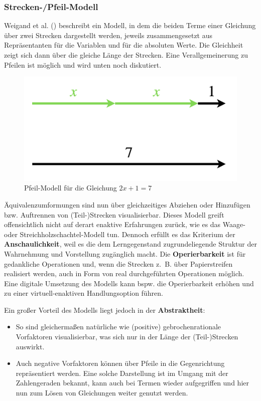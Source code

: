 \documentclass[
]{scrbook}
\theoremstyle{definition}
\theoremstyle{definition}
\theoremstyle{definition}
\theoremstyle{definition}
\theoremstyle{remark}
\begin{document}
\subsubsection{Strecken-/Pfeil-Modell}\label{strecken-pfeil-modell}

Weigand et al. () beschreibt ein Modell, in dem die beiden Terme einer Gleichung über zwei Strecken dargestellt werden, jeweils zusammengesetzt aus Repräsentanten für die Variablen und für die absoluten Werte. Die Gleichheit zeigt sich dann über die gleiche Länge der Strecken. Eine Verallgemeinerung zu Pfeilen ist möglich und wird unten noch diskutiert.

\begin{figure}

{\centering \includegraphics[width=0.5\linewidth]{pictures/8-Pfeile} 

}

\caption{Pfeil-Modell für die Gleichung $2x+1 = 7$}\label{fig:Pfeile}
\end{figure}

Äquivalenzumformungen sind nun über gleichzeitiges Abziehen oder Hinzufügen bzw. Auftrennen von (Teil-)Strecken visualisierbar. Dieses Modell greift offensichtlich nicht auf derart enaktive Erfahrungen zurück, wie es das Waage- oder Streichholzschachtel-Modell tun. Dennoch erfüllt es das Kriterium der \textbf{Anschaulichkeit}, weil es die dem Lerngegenstand zugrundeliegende Struktur der Wahrnehmung und Vorstellung zugänglich macht. Die \textbf{Operierbarkeit} ist für gedankliche Operationen und, wenn die Strecken z.~B. über Papierstreifen realisiert werden, auch in Form von real durchgeführten Operationen möglich. Eine digitale Umsetzung des Modells kann bspw. die Operierbarkeit erhöhen und zu einer virtuell-enaktiven Handlungsoption führen.

Ein großer Vorteil des Modells liegt jedoch in der \textbf{Abstraktheit}:

\begin{itemize}
\item
  So sind gleichermaßen natürliche wie (positive) gebrochenrationale Vorfaktoren visualisierbar, was sich nur in der Länge der (Teil-)Strecken auswirkt.
\item
  Auch negative Vorfaktoren können über Pfeile in die Gegenrichtung repräsentiert werden. Eine solche Darstellung ist im Umgang mit der Zahlengeraden bekannt, kann auch bei Termen wieder aufgegriffen und hier nun zum Lösen von Gleichungen weiter genutzt werden.
\end{itemize}
\end{document}
